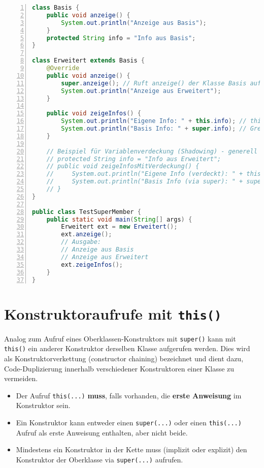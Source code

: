 \begin{lstlisting}[language=Java, caption={Zugriff auf überschriebene Methode der Oberklasse via \texttt{super.}}, label=lst:super_member, 
    basicstyle=\ttfamily\footnotesize, breaklines=true, frame=tb, numbers=left]
class Basis {
    public void anzeige() {
        System.out.println("Anzeige aus Basis");
    }
    protected String info = "Info aus Basis";
}

class Erweitert extends Basis {
    @Override
    public void anzeige() {
        super.anzeige(); // Ruft anzeige() der Klasse Basis auf
        System.out.println("Anzeige aus Erweitert");
    }
    
    public void zeigeInfos() {
        System.out.println("Eigene Info: " + this.info); // this.info ist hier redundant, da info nicht neu deklariert wurde
        System.out.println("Basis Info: " + super.info); // Greift auf info der Basisklasse zu
    }

    // Beispiel für Variablenverdeckung (Shadowing) - generell vermeiden!
    // protected String info = "Info aus Erweitert"; 
    // public void zeigeInfosMitVerdeckung() {
    //     System.out.println("Eigene Info (verdeckt): " + this.info); // Info aus Erweitert
    //     System.out.println("Basis Info (via super): " + super.info); // Info aus Basis
    // }
}

public class TestSuperMember {
    public static void main(String[] args) {
        Erweitert ext = new Erweitert();
        ext.anzeige();
        // Ausgabe:
        // Anzeige aus Basis
        // Anzeige aus Erweitert
        ext.zeigeInfos();
    }
}
\end{lstlisting}


\section{Konstruktoraufrufe mit \texttt{this()}}
\label{sec:this_konstruktor}

Analog zum Aufruf eines Oberklassen-Konstruktors mit \texttt{super()} kann mit \texttt{this()} ein anderer Konstruktor derselben 
Klasse aufgerufen werden. Dies wird als Konstruktorverkettung (constructor chaining) bezeichnet und dient dazu, Code-Duplizierung 
innerhalb verschiedener Konstruktoren einer Klasse zu vermeiden.
\begin{itemize}
    \item Der Aufruf \texttt{this(...)} \textbf{muss}, falls vorhanden, die \textbf{erste Anweisung} im Konstruktor sein.
    \item Ein Konstruktor kann entweder einen \texttt{super(...)} oder einen \texttt{this(...)} Aufruf als erste Anweisung enthalten, aber nicht beide.
    \item Mindestens ein Konstruktor in der Kette muss (implizit oder explizit) den Konstruktor der Oberklasse via \texttt{super(...)} aufrufen.
\end{itemize}

